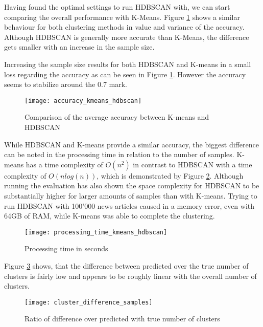 Having found the optimal settings to run HDBSCAN with, we can start comparing the overall performance with K-Means. Figure \ref{fig:accuracy_kmeans_hdbscan} shows  a similar behaviour for both clustering methods in value and variance of the accuracy. Although HDBSCAN is generally more accurate than K-Means, the difference gets smaller with an increase in the sample size. 

Increasing the sample size results for both HDBSCAN and K-means in a small loss regarding the accuracy as can be seen in Figure \ref{fig:accuracy_kmeans_hdbscan}. However the accuracy seems to stabilize around the 0.7 mark.

\begin{figure}[h]
    \centering
    \texttt{[image: accuracy\_kmeans\_hdbscan]}
    \caption{Comparison of the average accuracy between K-means and HDBSCAN}
    \label{fig:accuracy_kmeans_hdbscan}
\end{figure}

While HDBSCAN and K-means provide a similar accuracy, the biggest difference can be noted in the processing time in relation to the number of samples. K-means has a time complexity of $O(n^2)$ in contrast to HDBSCAN with a time complexity of $O(nlog(n))$, which is demonstrated by Figure \ref{fig:processing_time_kmeans_hdbscan}. Although running the evaluation has also shown the space complexity for HDBSCAN to be substantially higher for larger amounts of samples than with K-means. Trying to run HDBSCAN with 100'000 news articles caused in a memory error, even with 64GB of RAM, while K-means was able to complete the clustering.


\begin{figure}[h]
    \centering
    \texttt{[image: processing\_time\_kmeans\_hdbscan]}
    \caption{Processing time in seconds }
    \label{fig:processing_time_kmeans_hdbscan}
\end{figure}

Figure \ref{fig:cluster_difference_samples} shows, that the difference between predicted over the true number of clusters is fairly low and appears to be roughly linear with the overall number of clusters.  

\begin{figure}[h]
    \centering
    \texttt{[image: cluster\_difference\_samples]}
    \caption{Ratio of difference over predicted with true number of clusters}
    \label{fig:cluster_difference_samples}
\end{figure}


